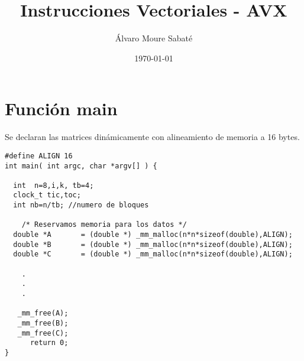 \documentclass[11pt]{article}
\title{Instrucciones Vectoriales - AVX}
\author{Álvaro Moure Sabaté}
\date{\today}
\begin{document}
\maketitle
\tableofcontents

\section{Función main}
Se declaran las matrices dinámicamente con alineamiento de memoria a 16 bytes.
\begin{verbatim}
#define ALIGN 16
int main( int argc, char *argv[] ) {

  int  n=8,i,k, tb=4;
  clock_t tic,toc;
  int nb=n/tb; //numero de bloques
  
    /* Reservamos memoria para los datos */
  double *A       = (double *) _mm_malloc(n*n*sizeof(double),ALIGN);
  double *B       = (double *) _mm_malloc(n*n*sizeof(double),ALIGN);
  double *C       = (double *) _mm_malloc(n*n*sizeof(double),ALIGN);
    
    .  
    .
    .

   _mm_free(A);
   _mm_free(B);
   _mm_free(C);
      return 0;
}
\end{verbatim}
\end{document}
